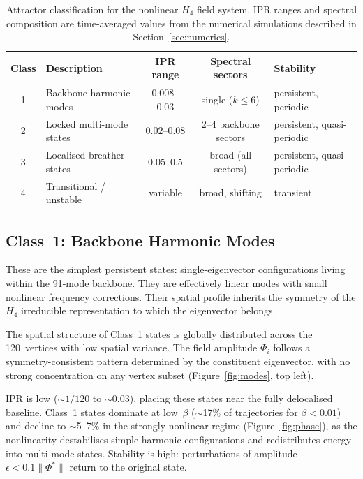 \documentclass[12pt,a4paper]{article}
\newcommand{\Hfour}{H_4}
\begin{document}
\begin{table}[H]
\centering
\caption{Attractor classification for the nonlinear $\Hfour$ field
system.  IPR ranges and spectral composition are time-averaged
values from the numerical simulations described in
Section~\ref{sec:numerics}.}
\label{tab:classes}
\begin{tabular}{@{}clccl@{}}
\toprule
Class & Description & IPR range &
  Spectral sectors & Stability \\
\midrule
1 & Backbone harmonic modes & $0.008$--$0.03$ &
  single ($k \leq 6$) & persistent, periodic \\
2 & Locked multi-mode states & $0.02$--$0.08$ &
  2--4 backbone sectors & persistent, quasi-periodic \\
3 & Localised breather states & $0.05$--$0.5$ &
  broad (all sectors) & persistent, quasi-periodic \\
4 & Transitional / unstable & variable &
  broad, shifting & transient \\
\bottomrule
\end{tabular}
\end{table}

\subsection{Class~1: Backbone Harmonic Modes}

These are the simplest persistent states: single-eigenvector
configurations living within the 91-mode backbone.  They are
effectively linear modes with small nonlinear frequency corrections.
Their spatial profile inherits the symmetry of the $\Hfour$ irreducible
representation to which the eigenvector belongs.

The spatial structure of Class~1 states is globally distributed across
the 120~vertices with low spatial variance.  The field amplitude
$\Phi_i$ follows a symmetry-consistent pattern determined by the
constituent eigenvector, with no strong concentration on any vertex
subset (Figure~\ref{fig:modes}, top left).

IPR is low ($\sim 1/120$ to $\sim 0.03$), placing these states near
the fully delocalised baseline.  Class~1 states dominate at low~$\beta$
($\sim$17\% of trajectories for $\beta < 0.01$) and decline to
$\sim$5--7\% in the strongly nonlinear regime
(Figure~\ref{fig:phase}), as the nonlinearity destabilises simple
harmonic configurations and redistributes energy into multi-mode
states.  Stability is high: perturbations of amplitude
$\epsilon < 0.1 \lVert \Phi^* \rVert$ return to the original state.
\end{document}
